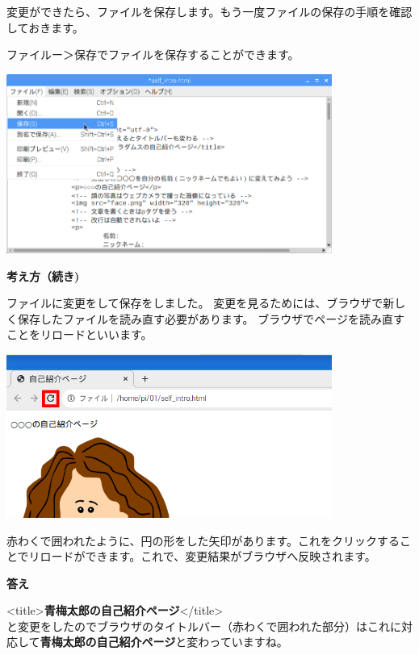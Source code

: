 \documentclass[a4paper,12pt]{jarticle}
\begin{document}
\bigskip

\flushleft
変更ができたら、ファイルを保存します。もう一度ファイルの保存の手順を確認しておきます。

ファイルー＞保存でファイルを保存することができます。



\centering
\includegraphics[width=0.8\textwidth]{textbook-img147.png}



\clearpage
\flushleft
\textbf{考え方（続き)}




ファイルに変更をして保存をしました。
変更を見るためには、ブラウザで新しく保存したファイルを読み直す必要があります。
ブラウザでページを読み直すことをリロードといいます。


\bigskip


\bigskip
\centering
\includegraphics[width=0.8\textwidth]{textbook-img149.png}

\flushleft
赤わくで囲われたように、円の形をした矢印があります。これをクリックすることでリロードができます。これで、変更結果がブラウザへ反映されます。

\vfill
\clearpage
\textbf{答え}


{\textless}title{\textgreater}\textbf{青梅太郎の自己紹介ページ}{\textless}/title{\textgreater}\\
と変更をしたのでブラウザのタイトルバー（赤わくで囲われた部分）はこれに対応して\textbf{青梅太郎の自己紹介ページ}と変わっていますね。
\end{document}
